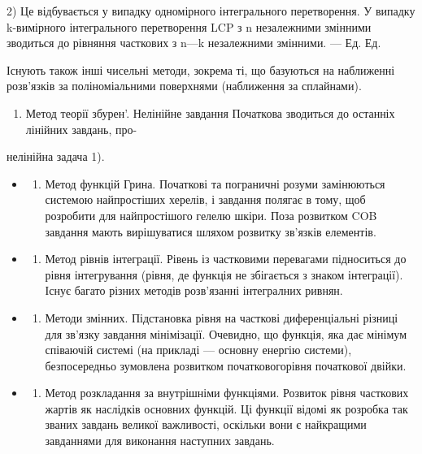 \documentclass[
  ukrainian,
]{article}
\providecommand{\tightlist}{%
  \setlength{\itemsep}{0pt}\setlength{\parskip}{0pt}}
\begin{document}
2) Це відбувається у випадку одномірного інтегрального перетворення. У
випадку k-вимірного інтегрального перетворення LCP з n незалежними
змінними зводиться до рівняння часткових з n---k незалежними змінними.
--- Ед. Ед.

Існують також інші чисельні методи, зокрема ті, що базуються на
наближенні розв'язків за поліноміальними поверхнями (наближення за
сплайнами).

\begin{enumerate}
\def\labelenumi{\arabic{enumi}.}
\setcounter{enumi}{5}
\tightlist
\item
  Метод теорії збурен'. Нелінійне завдання Початкова зводиться до
  останніх лінійних завдань, про-
\end{enumerate}

нелінійна задача 1).

\begin{itemize}
\tightlist
\item
  \begin{enumerate}
  \def\labelenumi{\arabic{enumi}.}
  \setcounter{enumi}{6}
  \tightlist
  \item
    Метод функцій Грина. Початкові та пограничні розуми замінюються
    системою найпростіших херелів, і завдання полягає в тому, щоб
    розробити для найпростішого гелелю шкіри. Поза розвитком COB
    завдання мають вирішуватися шляхом розвитку зв'язків елементів.
  \end{enumerate}
\item
  \begin{enumerate}
  \def\labelenumi{\arabic{enumi}.}
  \setcounter{enumi}{7}
  \tightlist
  \item
    Метод рівнів інтеграції. Рівень із частковими перевагами підноситься
    до рівня інтегрування (рівня, де функція не збігається з знаком
    інтеграції). Існує багато різних методів розв'язанні інтегралних
    ривнян.
  \end{enumerate}
\item
  \begin{enumerate}
  \def\labelenumi{\arabic{enumi}.}
  \setcounter{enumi}{8}
  \tightlist
  \item
    Методи змінних. Підстановка рівня на часткові диференціальні різниці
    для зв'язку завдання мінімізації. Очевидно, що функція, яка дає
    мінімум співаючій системі (на прикладі --- основну енергію системи),
    безпосередньо зумовлена розвитком початковогорівня початкової
    двійки.
  \end{enumerate}
\item
  \begin{enumerate}
  \def\labelenumi{\arabic{enumi}.}
  \setcounter{enumi}{9}
  \tightlist
  \item
    Метод розкладання за внутрішніми функціями. Розвиток рівня часткових
    жартів як наслідків основних функцій. Ці функції відомі як розробка
    так званих завдань великої важливості, оскільки вони є найкращими
    завданнями для виконання наступних завдань.
  \end{enumerate}
\end{itemize}
\end{document}
